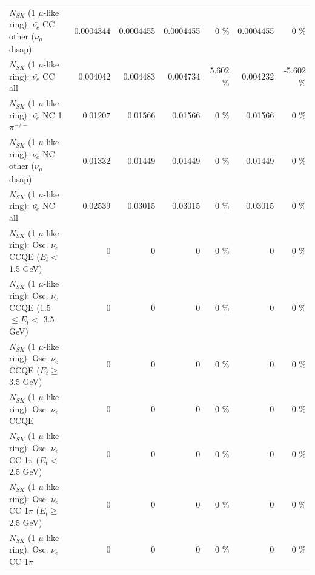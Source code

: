 \begin{table}
\begin{tabular}{| l | r | r | r  r | r  r |}
          $N_{SK}$ (1 $\mu$-like ring): $\bar{\nu_e}$ CC other ($\nu_\mu$ disap) &       0.0004344 &       0.0004455 &       0.0004455 &        0 \%  &       0.0004455 &        0 \%  \\ 
                            $N_{SK}$ (1 $\mu$-like ring): $\bar{\nu_{e}}$ CC all &        0.004042 &        0.004483 &        0.004734 &    5.602 \%  &        0.004232 &   -5.602 \%  \\ 
\hline
                     $N_{SK}$ (1 $\mu$-like ring): $\bar{\nu_e}$ NC 1$\pi^{+/-}$ &         0.01207 &         0.01566 &         0.01566 &        0 \%  &         0.01566 &        0 \%  \\ 
          $N_{SK}$ (1 $\mu$-like ring): $\bar{\nu_e}$ NC other ($\nu_\mu$ disap) &         0.01332 &         0.01449 &         0.01449 &        0 \%  &         0.01449 &        0 \%  \\ 
                            $N_{SK}$ (1 $\mu$-like ring): $\bar{\nu_{e}}$ NC all &         0.02539 &         0.03015 &         0.03015 &        0 \%  &         0.03015 &        0 \%  \\ 
\hline
\hline
\hline
             $N_{SK}$ (1 $\mu$-like ring): Osc. $\nu_e$ CCQE ($E_{t} <$ 1.5 GeV) &               0 &               0 &               0 &        0 \%  &               0 &        0 \%  \\ 
    $N_{SK}$ (1 $\mu$-like ring): Osc. $\nu_e$ CCQE (1.5 $\leq E_{t} <$ 3.5 GeV) &               0 &               0 &               0 &        0 \%  &               0 &        0 \%  \\ 
          $N_{SK}$ (1 $\mu$-like ring): Osc. $\nu_e$ CCQE ($E_{t} \geq$ 3.5 GeV) &               0 &               0 &               0 &        0 \%  &               0 &        0 \%  \\ 
\hline
                                 $N_{SK}$ (1 $\mu$-like ring): Osc. $\nu_e$ CCQE &               0 &               0 &               0 &        0 \%  &               0 &        0 \%  \\ 
\hline
        $N_{SK}$ (1 $\mu$-like ring): Osc. $\nu_e$ CC 1$\pi$ ($E_{t} <$ 2.5 GeV) &               0 &               0 &               0 &        0 \%  &               0 &        0 \%  \\ 
     $N_{SK}$ (1 $\mu$-like ring): Osc. $\nu_e$ CC 1$\pi$ ($E_{t} \geq$ 2.5 GeV) &               0 &               0 &               0 &        0 \%  &               0 &        0 \%  \\ 
\hline
                            $N_{SK}$ (1 $\mu$-like ring): Osc. $\nu_e$ CC 1$\pi$ &               0 &               0 &               0 &        0 \%  &               0 &        0 \%  \\ 

\end{tabular}
\end{table}
